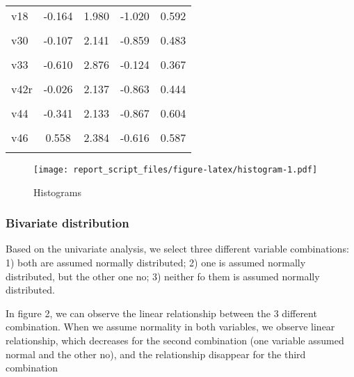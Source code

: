 \documentclass[
]{article}
\begin{document}
\begin{table}[!h]
\begin{tabular}[t]{lcccc}
\addlinespace
v18 & -0.164 & 1.980 & -1.020 & 0.592\\
\cellcolor{gray!6}{v29} & \cellcolor{gray!6}{0.042} & \cellcolor{gray!6}{2.084} & \cellcolor{gray!6}{-0.916} & \cellcolor{gray!6}{0.479}\\
v30 & -0.107 & 2.141 & -0.859 & 0.483\\
\cellcolor{gray!6}{v31} & \cellcolor{gray!6}{-0.198} & \cellcolor{gray!6}{2.447} & \cellcolor{gray!6}{-0.553} & \cellcolor{gray!6}{0.375}\\
v33 & -0.610 & 2.876 & -0.124 & 0.367\\
\addlinespace
\cellcolor{gray!6}{v34} & \cellcolor{gray!6}{-0.806} & \cellcolor{gray!6}{3.277} & \cellcolor{gray!6}{0.277} & \cellcolor{gray!6}{0.542}\\
v42r & -0.026 & 2.137 & -0.863 & 0.444\\
\cellcolor{gray!6}{v43} & \cellcolor{gray!6}{-0.716} & \cellcolor{gray!6}{2.875} & \cellcolor{gray!6}{-0.125} & \cellcolor{gray!6}{0.420}\\
v44 & -0.341 & 2.133 & -0.867 & 0.604\\
\cellcolor{gray!6}{v45} & \cellcolor{gray!6}{0.522} & \cellcolor{gray!6}{2.299} & \cellcolor{gray!6}{-0.701} & \cellcolor{gray!6}{0.612}\\
\addlinespace
v46 & 0.558 & 2.384 & -0.616 & 0.587\\
\cellcolor{gray!6}{v47} & \cellcolor{gray!6}{0.596} & \cellcolor{gray!6}{2.271} & \cellcolor{gray!6}{-0.729} & \cellcolor{gray!6}{0.663}\\
\bottomrule
\end{tabular}
\end{table}

\begin{figure}
\centering
\texttt{[image: report\_script\_files/figure-latex/histogram-1.pdf]}
\caption{Histograms}
\end{figure}

\hypertarget{bivariate-distribution}{%
\subsubsection{Bivariate distribution}\label{bivariate-distribution}}

Based on the univariate analysis, we select three different variable
combinations: 1) both are assumed normally distributed; 2) one is
assumed normally distributed, but the other one no; 3) neither fo them
is assumed normally distributed.

In figure 2, we can observe the linear relationship between the 3
different combination. When we assume normality in both variables, we
observe linear relationship, which decreases for the second combination
(one variable assumed normal and the other no), and the relationship
disappear for the third combination
\end{document}
